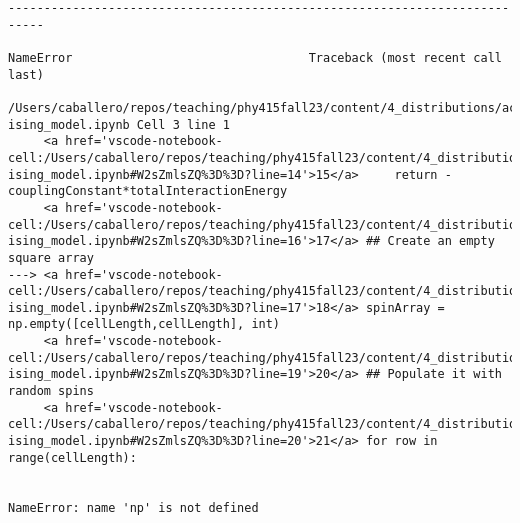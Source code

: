 \begin{Shaded}
\begin{Highlighting}[]
\OperatorTok{=}\NormalTok{(}\NormalTok{,}\NormalTok{))}
\OperatorTok{=}\OperatorTok{=}\NormalTok{)}
\NormalTok{)}
\end{Highlighting}
\end{Shaded}

\begin{verbatim}
---------------------------------------------------------------------------

NameError                                 Traceback (most recent call last)

/Users/caballero/repos/teaching/phy415fall23/content/4_distributions/activity-ising_model.ipynb Cell 3 line 1
     <a href='vscode-notebook-cell:/Users/caballero/repos/teaching/phy415fall23/content/4_distributions/activity-ising_model.ipynb#W2sZmlsZQ%3D%3D?line=14'>15</a>     return -couplingConstant*totalInteractionEnergy
     <a href='vscode-notebook-cell:/Users/caballero/repos/teaching/phy415fall23/content/4_distributions/activity-ising_model.ipynb#W2sZmlsZQ%3D%3D?line=16'>17</a> ## Create an empty square array
---> <a href='vscode-notebook-cell:/Users/caballero/repos/teaching/phy415fall23/content/4_distributions/activity-ising_model.ipynb#W2sZmlsZQ%3D%3D?line=17'>18</a> spinArray = np.empty([cellLength,cellLength], int)
     <a href='vscode-notebook-cell:/Users/caballero/repos/teaching/phy415fall23/content/4_distributions/activity-ising_model.ipynb#W2sZmlsZQ%3D%3D?line=19'>20</a> ## Populate it with random spins
     <a href='vscode-notebook-cell:/Users/caballero/repos/teaching/phy415fall23/content/4_distributions/activity-ising_model.ipynb#W2sZmlsZQ%3D%3D?line=20'>21</a> for row in range(cellLength):


NameError: name 'np' is not defined
\end{verbatim}

